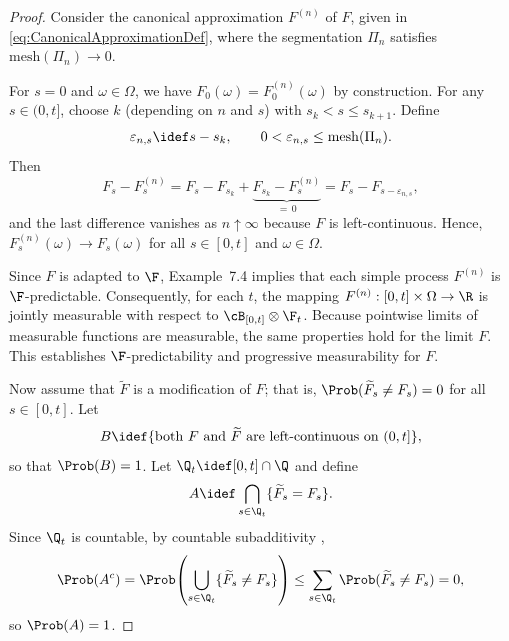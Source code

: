 \begin{proof}
	Consider the canonical approximation \(F^{(n)}\) of \(F\), given in \eqref{eq:CanonicalApproximationDef}, where the segmentation \(\Pi_n\) satisfies \(\mathrm{mesh}(\Pi_n) \to 0\).

	For \(s = 0\) and \(\omega \in \Omega\), we have \(F_0(\omega) = F_0^{(n)}(\omega)\) by construction. For any \(s \in (0, t]\), choose \(k\) (depending on \(n\) and \(s\)) with \(s_k < s \le s_{k+1}\). Define
	\begin{equation}\label{eq:EpsilonNs}
		\varepsilon_{n,s} \idef s - s_k, \qquad 0 < \varepsilon_{n,s} \le \mathrm{mesh}(\Pi_n).
	\end{equation}
	Then
	\begin{equation}\label{eq:FnConvergencePointwise}
		F_s - F^{(n)}_s
		= F_s - F_{s_k} + \underbrace{F_{s_k} - F^{(n)}_s}_{=\,0}
		= F_s - F_{s - \varepsilon_{n,s}},
	\end{equation}
	and the last difference vanishes as \(n \uparrow \infty\) because \(F\) is left-continuous. Hence, \(F^{(n)}_s(\omega) \to F_s(\omega)\) for all \(s \in [0, t]\) and \(\omega \in \Omega\).

	Since \(F\) is adapted to \(\F\), Example~7.4 implies that each simple process \(F^{(n)}\) is \(\F\)-predictable. Consequently, for each \(t\), the mapping \(F^{(n)} : [0, t] \times \Omega \to \R\) is jointly measurable with respect to \(\cB_{[0, t]} \otimes \F_t\). Because pointwise limits of measurable functions are measurable, the same properties hold for the limit \(F\). This establishes \(\F\)-predictability and progressive measurability for \(F\).

	Now assume that \(\widetilde{F}\) is a modification of \(F\); that is, \(\Prob(\widetilde{F}_s \ne F_s) = 0\) for all \(s \in [0, t]\). Let
	\begin{equation}\label{eq:EventB}
		B \idef \{\text{both } F \text{ and } \widetilde{F} \text{ are left-continuous on } (0, t]\},
	\end{equation}
	so that \(\Prob(B) = 1\). Let \(\Q_t \idef [0, t] \cap \Q\) and define
	\begin{equation}\label{eq:EventA}
		A \idef \bigcap_{s \in \Q_t} \{\widetilde{F}_s = F_s\}.
	\end{equation}
	Since \(\Q_t\) is countable, by countable subadditivity ,
	\begin{equation}\label{eq:AprobOne}
		\Prob(A^c)
		= \Prob\!\left(\bigcup_{s \in \Q_t} \{\widetilde{F}_s \ne F_s\}\right)
		\le \sum_{s \in \Q_t} \Prob(\widetilde{F}_s \ne F_s) = 0,
	\end{equation}
	so \(\Prob(A) = 1\).


\end{proof}
